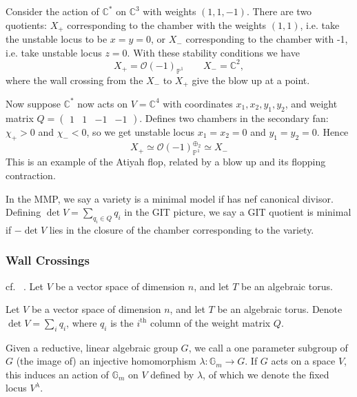 \begin{example}{}{}
Consider the action of $\mathbb{C}^{*}$ on $\mathbb{C}^3$ with weights $(1,1,-1)$. 
There are two quotients: $X_+$ corresponding to the chamber with the weights $(1,1)$, i.e. take the unstable locus to be $x=y= 0$, or $X_-$ corresponding to the chamber with -1, i.e. take unstable locus $z = 0$. With these stability conditions we have $$
X_{+}= \mathcal{O}(-1)_{\mathbb{P}^{1}} \qquad X_{-}= \mathbb{C}^2, $$ where the wall crossing from the $X_-$ to $X_+$ give the blow up at a point. 

Now suppose $\mathbb{C}^*$ now acts on $V = \mathbb{C}^4$  with coordinates $x_{1}, x_{2}, y_{1},y_{2}$, and weight matrix $Q = \begin{pmatrix}1&1&-1&-1\end{pmatrix}$. 
Defines two chambers in the secondary fan: $\chi_{+}>0$ and $\chi_{-}<0$, so we get unstable locus $x_{1}= x_{2}= 0$ and $y_{1}= y_{2}=0$. Hence $$
X_{+}\simeq \mathcal{O}(-1)_{\mathbb{P}^{1}}^{\oplus_{2}}\simeq X_-
$$This is an example of the Atiyah flop, related by a blow up and its flopping contraction. 
\end{example}


In the MMP, we say a variety is a minimal model if has nef canonical divisor. Defining $\det V = \sum_{q_{i}\in Q}q_i$ in the GIT picture, we  say a GIT quotient is minimal if $-\det V$ lies in the closure of the chamber corresponding to the variety. 

\subsubsection{Wall Crossings}

cf. ~\cite*{Kite_2022,ballard2014variation}. Let $V$ be a vector space of dimension $n$, and let $T$ be an algebraic torus.

Let $V$ be a vector space of dimension $n$, and let $T$ be an algebraic torus. Denote $\det V = \sum_i q_i$, where $q_i$ is the $i^\mathrm{th}$ column of the weight matrix $Q$. 

\begin{definition}{}{}
    Given a reductive, linear algebraic group $G$, we call a one parameter subgroup of $G$ (the image of) an injective homomorphism $\lambda : \mathbb{G}_{m}\to G$. If $G$ acts on a space $V$, this induces an action of $\mathbb{G}_m$ on $V$ defined by $\lambda$, of which we denote the fixed locus $V^\lambda$. 
\end{definition}

